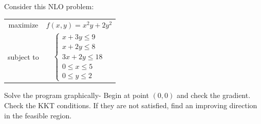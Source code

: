 \documentclass[c]{beamer}
\begin{document}


  \begin{frame}


  \begin{Exercise}
     Consider this NLO problem\cite{carter}:
    \begin{center}
     \begin{tabular}{cc}
      maximize & $f(x,y)=x^2y+2y^2$ \\
      subject to & $\begin{cases}x+3y\leq 9\\x+2y\leq 8\\3x+2y\leq 18\\0\leq x \leq 5\\0\leq y \leq 2\end{cases}$
    \end{tabular}
  \end{center}
    Solve the program graphically- Begin at point $(0,0)$ and check the gradient. Check the KKT conditions. If they are not satisfied, find an improving direction in the feasible region.
  \end{Exercise}

\end{frame}
\end{document}
